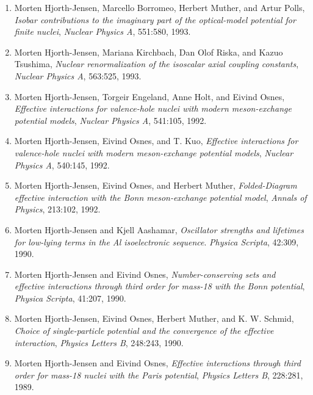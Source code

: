 \documentclass[%
oneside,                 %
final,                   %
10pt]{article}
\begin{document}
\begin{enumerate}
\item Morten Hjorth-Jensen, Marcello Borromeo, Herbert Muther, and Artur Polls, \emph{Isobar contributions to the imaginary part of the optical-model   potential for finite nuclei},  \emph{Nuclear Physics A}, 551:580, 1993. 

\item Morten Hjorth-Jensen, Mariana Kirchbach, Dan Olof Riska, and Kazuo Tsushima, \emph{Nuclear renormalization of the isoscalar axial coupling   constants},  \emph{Nuclear Physics A}, 563:525, 1993. 

\item Morten Hjorth-Jensen, Torgeir Engeland, Anne Holt, and Eivind Osnes, \emph{Effective interactions for valence-hole nuclei with modern   meson-exchange potential models},  \emph{Nuclear Physics A}, 541:105, 1992. 

\item Morten Hjorth-Jensen, Eivind Osnes, and T. Kuo, \emph{Effective interactions for valence-hole nuclei with modern   meson-exchange potential models},  \emph{Nuclear Physics A}, 540:145, 1992. 

\item Morten Hjorth-Jensen, Eivind Osnes, and Herbert Muther, \emph{Folded-Diagram effective interaction with the Bonn meson-exchange potential model},  \emph{Annals of Physics}, 213:102, 1992. 

\item Morten Hjorth-Jensen and Kjell Aashamar, \emph{Oscillator strengths and lifetimes for low-lying terms in the Al isoelectronic sequence}.  \emph{Physica Scripta}, 42:309, 1990. 

\item Morten Hjorth-Jensen and Eivind Osnes, \emph{Number-conserving sets and effective interactions through third order for mass-18 with the Bonn potential},  \emph{Physica Scripta}, 41:207, 1990. 

\item Morten Hjorth-Jensen, Eivind Osnes, Herbert Muther, and K. W. Schmid, \emph{Choice of single-particle potential and the convergence of the   effective interaction}, \emph{Physics Letters B}, 248:243, 1990. 

\item Morten Hjorth-Jensen and Eivind Osnes, \emph{Effective interactions through third order for mass-18 nuclei with the Paris potential}, \emph{Physics Letters B}, 228:281, 1989.   
\end{enumerate}
\end{document}

